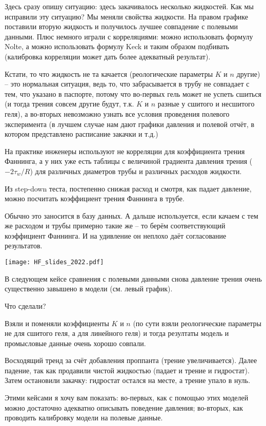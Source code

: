 \documentclass[main.tex]{subfiles}
\begin{document}
Здесь сразу опишу ситуацию: здесь закачивалось несколько жидкостей.
Как мы исправили эту ситуацию?
Мы меняли свойства жидкости.
На правом графике поставили вторую жидкость и получилось лучшее совпадение с полевыми данными.
Плюс немного играли с корреляциями: можно использовать формулу Nolte, а можно использовать формулу Keck и таким образом подбивать (калибровка корреляции может дать более адекватный результат).

Кстати, то что жидкость не та качается (реологические параметры $K$ и $n$ другие) -- это нормальная ситуация, ведь то, что забрасывается в трубу не совпадает с тем, что указано в паспорте, потому что во-первых гель может не успеть сшиться (и тогда трения совсем другие будут, т.к. $K$ и $n$ разные у сшитого и несшитого геля), а во-вторых невозможно узнать все условия проведения полевого эксперимента (в лучшем случае нам дают графики давления и полевой отчёт, в котором представлено расписание закачки и т.д.)

На практике инженеры используют не корреляции для коэффициента трения Фаннинга, а у них уже есть таблицы с величиной градиента давления трения ($-2\tau_w/R$) для различных диаметров трубы и различных расходов жидкости.

Из step-down теста, постепенно снижая расход и смотря, как падает давление, можно посчитать коэффициент трения Фаннинга в трубе.

Обычно это заносится в базу данных.
А дальше используется, если качаем с тем же расходом и трубы примерно такие же -- то берём соответствующий коэффициент Фаннинга.
И на удивление он неплохо даёт согласование результатов.

\texttt{[image: HF\_slides\_2022.pdf]}

В следующем кейсе сравнения с полевыми данными снова давление трения очень существенно завышено в модели (см. левый график).

Что сделали?

Взяли и поменяли коэффициенты $K$ и $n$ (по сути взяли реологические параметры не для сшитого геля, а для линейного геля) и тогда резултаты модель и промысловые данные очень хорошо совпали.

Восходящий тренд за счёт добавления проппанта (трение увеличивается).
Далее падение, так как продавили чистой жидкостью (падает и трение и гидростат).
Затем остановили закачку: гидростат остался на месте, а трение упало в нуль.

Этими кейсами я хочу вам показать: во-первых, как с помощью этих моделей можно достаточно адекватно описывать поведение давления; во-вторых, как проводить калибровку модели на полевые данные.
\end{document}
